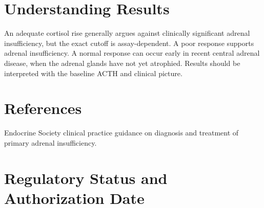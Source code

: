 \section*{Understanding Results}
An adequate cortisol rise generally argues against clinically significant adrenal insufficiency, but the exact cutoff is assay-dependent. A poor response supports adrenal insufficiency. A normal response can occur early in recent central adrenal disease, when the adrenal glands have not yet atrophied. Results should be interpreted with the baseline ACTH and clinical picture.

\section*{References}
Endocrine Society clinical practice guidance on diagnosis and treatment of primary adrenal insufficiency.

\clearpage


\section*{Regulatory Status and Authorization Date}

\clearpage
